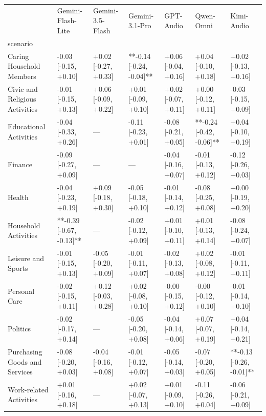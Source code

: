 \begin{tabular}{lllllll}
\toprule
 & Gemini-Flash-Lite & Gemini-3.5-Flash & Gemini-3.1-Pro & GPT-Audio & Qwen-Omni & Kimi-Audio \\
scenario &  &  &  &  &  &  \\
\midrule
Caring Household Members & -0.03 [-0.15, +0.10] & +0.02 [-0.27, +0.33] & **-0.14 [-0.24, -0.04]** & +0.06 [-0.04, +0.16] & +0.04 [-0.10, +0.18] & +0.02 [-0.13, +0.16] \\
Civic and Religious Activities & -0.01 [-0.15, +0.13] & +0.06 [-0.09, +0.22] & +0.01 [-0.09, +0.10] & +0.02 [-0.07, +0.11] & +0.00 [-0.12, +0.11] & -0.03 [-0.15, +0.09] \\
Educational Activities & -0.04 [-0.33, +0.26] & — & -0.11 [-0.23, +0.01] & -0.08 [-0.21, +0.05] & **-0.24 [-0.42, -0.06]** & +0.04 [-0.10, +0.19] \\
Finance & -0.09 [-0.27, +0.09] & — & — & -0.04 [-0.16, +0.07] & -0.01 [-0.13, +0.12] & -0.12 [-0.26, +0.03] \\
Health & -0.04 [-0.23, +0.19] & +0.09 [-0.18, +0.30] & -0.05 [-0.18, +0.10] & -0.01 [-0.14, +0.12] & -0.08 [-0.25, +0.08] & +0.00 [-0.19, +0.20] \\
Household Activities & **-0.39 [-0.67, -0.13]** & — & -0.02 [-0.12, +0.09] & +0.01 [-0.10, +0.11] & +0.01 [-0.13, +0.14] & -0.08 [-0.24, +0.07] \\
Leisure and Sports & -0.01 [-0.15, +0.13] & -0.05 [-0.20, +0.09] & -0.01 [-0.11, +0.07] & -0.02 [-0.13, +0.08] & +0.02 [-0.08, +0.12] & -0.01 [-0.11, +0.11] \\
Personal Care & -0.02 [-0.15, +0.11] & +0.12 [-0.03, +0.28] & +0.02 [-0.08, +0.10] & -0.00 [-0.15, +0.12] & -0.00 [-0.12, +0.10] & -0.01 [-0.14, +0.10] \\
Politics & -0.02 [-0.17, +0.14] & — & -0.05 [-0.20, +0.08] & -0.04 [-0.14, +0.06] & +0.07 [-0.07, +0.19] & +0.04 [-0.14, +0.21] \\
Purchasing Goods and Services & -0.08 [-0.20, +0.03] & -0.04 [-0.16, +0.08] & -0.01 [-0.12, +0.07] & -0.05 [-0.14, +0.03] & -0.07 [-0.20, +0.05] & **-0.13 [-0.26, -0.01]** \\
Work-related Activities & +0.01 [-0.16, +0.18] & — & +0.02 [-0.07, +0.13] & +0.01 [-0.09, +0.10] & -0.11 [-0.26, +0.04] & -0.06 [-0.21, +0.09] \\
\bottomrule
\end{tabular}
